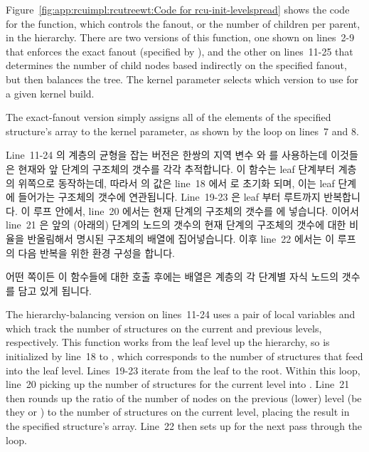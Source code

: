 Figure~\ref{fig:app:rcuimpl:rcutreewt:Code for rcu-init-levelspread}
shows the code for the  function, which controls
the fanout, or the number of children per parent,
in the  hierarchy.
There are two versions of this function, one shown on lines~2-9 that
enforces the exact fanout (specified by ),
and the other on lines~11-25 that determines the number of child nodes
based indirectly on the specified fanout, but then balances the tree.
The  kernel parameter selects which version
to use for a given kernel build.

The exact-fanout version simply assigns all of the elements of the
specified  structure's  array to
the  kernel parameter, as shown by the loop
on lines~7 and 8.
\fi

Line~11-24 의 계층의 균형을 잡는 버전은 한쌍의 지역 변수  와 
를 사용하는데 이것들은 현재와 앞 단계의  구조체의 갯수를 각각
추적합니다.
이 함수는 leaf 단계부터 계층의 위쪽으로 동작하는데, 따라서  의 값은
line~18 에서  로 초기화 되며, 이는 leaf 단계에 들어가는
 구조체의 갯수에 연관됩니다.
Line~19-23 은 leaf 부터 루트까지 반복합니다.
이 루프 안에서, line~20 에서는 현재 단계의  구조체의 갯수를
 에 넣습니다.
이어서 line~21 은 앞의 (아래의) 단계의 노드의 갯수의 현재 단계의 
구조체의 갯수에 대한 비율을 반올림해서 명시된  구조체의
 배열에 집어넣습니다.
이후 line~22 에서는 이 루프의 다음 반복을 위한 환경 구성을 합니다.

어떤 쪽이든 이 함수들에 대한 호출 후에는  배열은
 계층의 각 단계별 자식 노드의 갯수를 담고 있게 됩니다.
\iffalse

The hierarchy-balancing version on lines~11-24
uses a pair of local variables  and  which track
the number of  structures on the current and previous
levels, respectively.
This function works from the leaf level up the hierarchy, so 
is initialized by line~18 to , which corresponds
to the number of  structures that feed into the leaf level.
Lines~19-23 iterate from the leaf to the root.
Within this loop, line~20 picking up
the number of  structures for the current level into
.
Line~21 then rounds up the ratio of the number of nodes on the previous
(lower) level (be they  or )
to the number of  structures on the current
level, placing the result in the specified  structure's
 array.
Line~22 then sets up for the next pass through the loop.

